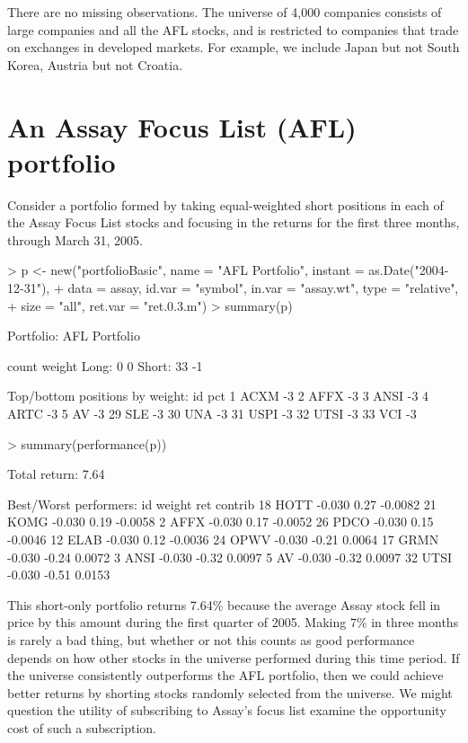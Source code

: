 \documentclass{article}
\begin{document}
There are no missing observations. The universe of 4,000 companies
consists of large companies and all the AFL stocks, and is restricted
to companies that trade on exchanges in developed markets. For
example, we include Japan but not South Korea, Austria but not
Croatia.

\section{An Assay Focus List (AFL) portfolio}

Consider a portfolio formed by taking equal-weighted short positions
in each of the Assay Focus List stocks and focusing in the returns for the
first three months, through March 31, 2005.


\begin{Schunk}
\begin{Sinput}
> p <- new("portfolioBasic", name = "AFL Portfolio", instant = as.Date("2004-12-31"), 
+     data = assay, id.var = "symbol", in.var = "assay.wt", type = "relative", 
+     size = "all", ret.var = "ret.0.3.m")
> summary(p)
\end{Sinput}
\begin{Soutput}
Portfolio: AFL Portfolio

        count       weight
Long:       0            0 
Short:     33           -1 

Top/bottom positions by weight:
     id pct
1  ACXM  -3
2  AFFX  -3
3  ANSI  -3
4  ARTC  -3
5    AV  -3
29  SLE  -3
30  UNA  -3
31 USPI  -3
32 UTSI  -3
33  VCI  -3
\end{Soutput}
\begin{Sinput}
> summary(performance(p))
\end{Sinput}
\begin{Soutput}
Total return:  7.64 % 

Best/Worst performers:
     id weight   ret contrib
18 HOTT -0.030  0.27 -0.0082
21 KOMG -0.030  0.19 -0.0058
2  AFFX -0.030  0.17 -0.0052
26 PDCO -0.030  0.15 -0.0046
12 ELAB -0.030  0.12 -0.0036
24 OPWV -0.030 -0.21  0.0064
17 GRMN -0.030 -0.24  0.0072
3  ANSI -0.030 -0.32  0.0097
5    AV -0.030 -0.32  0.0097
32 UTSI -0.030 -0.51  0.0153
\end{Soutput}
\end{Schunk}

This short-only portfolio returns 7.64\% because the average Assay
stock fell in price by this amount during the first quarter of 2005.
Making 7\% in three months is rarely a bad thing, but whether or not
this counts as good performance depends on how other stocks in the
universe performed during this time period.  If the universe
consistently outperforms the AFL portfolio, then we could achieve
better returns by shorting stocks randomly selected from the universe.
We might question the utility of subscribing to Assay's focus list
examine the opportunity cost of such a subscription.
\end{document}
